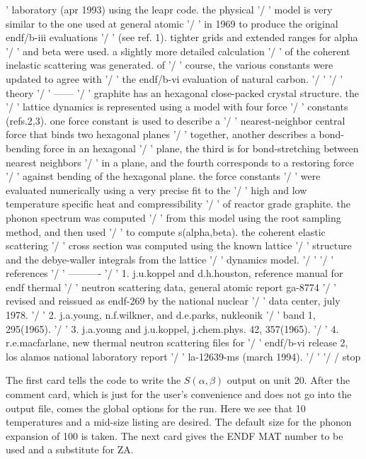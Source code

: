 \begin{ccode}
' laboratory (apr 1993) using the leapr code.  the physical '/
' model is very similar to the one used at general atomic '/
' in 1969 to produce the original endf/b-iii evaluations '/
' (see ref. 1).  tighter grids and extended ranges for alpha '/
' and beta were used.  a slightly more detailed calculation '/
' of the coherent inelastic scattering was generated.  of '/
' course, the various constants were updated to agree with '/
' the endf/b-vi evaluation of natural carbon. '/
'  '/
' theory '/
' ------ '/
' graphite has an hexagonal close-packed crystal structure.  the '/
' lattice dynamics is represented using a model with four force '/
' constants (refs.2,3).  one force constant is used to describe a '/
' nearest-neighbor central force that binds two hexagonal planes '/
' together, another describes a bond-bending force in an hexagonal '/
' plane, the third is for bond-stretching between nearest neighbors '/
' in a plane, and the fourth corresponds to a restoring force '/
' against bending of the hexagonal plane.  the force constants '/
' were evaluated numerically using a very precise fit to the '/
' high and low temperature specific heat and compressibility '/
' of reactor grade graphite.  the phonon spectrum was computed '/
' from this model using the root sampling method, and then used '/
' to compute s(alpha,beta). the coherent elastic scattering '/
' cross section was computed using the known lattice '/
' structure and the debye-waller integrals from the lattice '/
' dynamics model. '/
'  '/
' references '/
' ---------- '/
' 1. j.u.koppel and d.h.houston, reference manual for endf thermal '/
'    neutron scattering data, general atomic report ga-8774 '/
'    revised and reissued as endf-269 by the national nuclear '/
'    data center, july 1978. '/
' 2. j.a.young, n.f.wilkner, and d.e.parks, nukleonik '/
'    band 1, 295(1965). '/
' 3. j.a.young and j.u.koppel, j.chem.phys. 42, 357(1965). '/
' 4. r.e.macfarlane, new thermal neutron scattering files for '/
'    endf/b-vi release 2, los alamos national laboratory report '/
'    la-12639-ms (march 1994). '/
'  '/
/
stop

\end{ccode}
\normalsize

The first card tells the code to write the $S(\alpha,\beta)$ output
on unit 20.  After the comment card, which is just for the user's
convenience and does not go into the output file, comes the global
options for the run.  Here we see that 10 temperatures and a
mid-size listing are desired.  The default size for the phonon
expansion of 100 is taken.  The next card gives the ENDF MAT
number to be used and a substitute for ZA.

